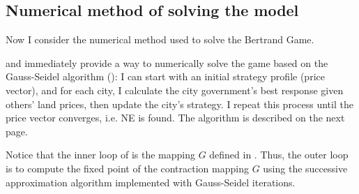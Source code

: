 \subsection{Numerical method of solving the model}
Now I consider the numerical method used to solve the Bertrand Game.

 and  immediately provide a way to
numerically solve the game based
on the Gauss-Seidel algorithm ():
I can start with an initial strategy profile
(price vector), and for each city,
I calculate the city government's best response given others' land prices,
then update the city's strategy. I repeat this process until the price vector converges, i.e.
NE is found. The algorithm is described on the next page.

Notice that the inner loop of  is the mapping $G$
defined in . Thus, the outer loop is to
compute the fixed point of the contraction mapping $G$ using
the successive approximation algorithm implemented with Gauss-Seidel iterations.











